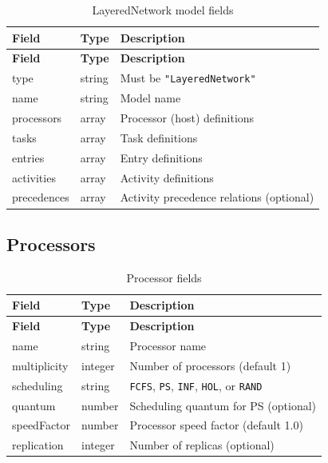 \begin{footnotesize}
\begin{longtable}{|T{2.2cm}|T{2.2cm}|D{8.5cm}|}
\caption{LayeredNetwork model fields}\label{tab:json-lqn}
\\\hline
\textbf{Field} & \textbf{Type} & \textbf{Description} \\\hline
\endfirsthead
\hline \textbf{Field} & \textbf{Type} & \textbf{Description} \\\hline
\endhead
\hline
\endfoot
type        & string & Must be \texttt{"LayeredNetwork"} \\\hline
name        & string & Model name \\\hline
processors  & array  & Processor (host) definitions \\\hline
tasks       & array  & Task definitions \\\hline
entries     & array  & Entry definitions \\\hline
activities  & array  & Activity definitions \\\hline
precedences & array  & Activity precedence relations (optional) \\\hline
\end{longtable}
\end{footnotesize}

\subsection{Processors}
\label{json:lqn-proc}

\begin{footnotesize}
\begin{longtable}{|T{2.2cm}|T{2.2cm}|D{8.5cm}|}
\caption{Processor fields}\label{tab:json-proc}
\\\hline
\textbf{Field} & \textbf{Type} & \textbf{Description} \\\hline
\endfirsthead
\hline \textbf{Field} & \textbf{Type} & \textbf{Description} \\\hline
\endhead
\hline
\endfoot
name         & string  & Processor name \\\hline
multiplicity & integer & Number of processors (default 1) \\\hline
scheduling   & string  & \texttt{FCFS}, \texttt{PS}, \texttt{INF}, \texttt{HOL}, or \texttt{RAND} \\\hline
quantum      & number  & Scheduling quantum for PS (optional) \\\hline
speedFactor  & number  & Processor speed factor (default 1.0) \\\hline
replication  & integer & Number of replicas (optional) \\\hline
\end{longtable}
\end{footnotesize}

